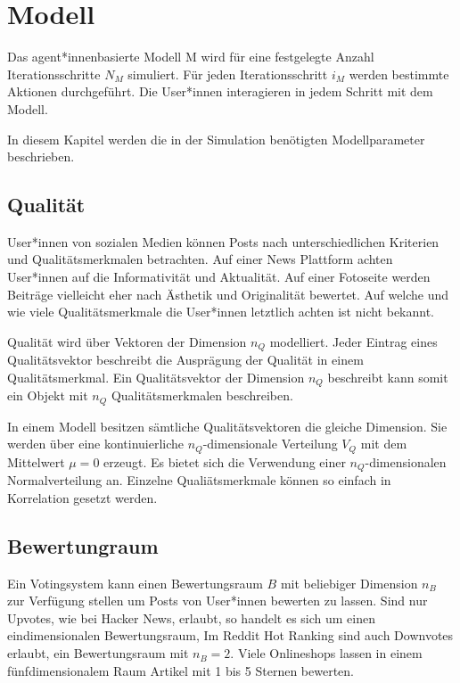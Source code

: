 \chapter{Modell}

Das agent*innenbasierte Modell \ac{M} wird für eine festgelegte Anzahl Iterationsschritte $N_M$ simuliert. Für jeden Iterationsschritt $i_M$ werden bestimmte Aktionen durchgeführt. Die User*innen interagieren in jedem Schritt mit dem Modell.

In diesem Kapitel werden die in der Simulation benötigten Modellparameter beschrieben.

\section{Qualität}
User*innen von sozialen Medien können Posts nach unterschiedlichen Kriterien und Qualitätsmerkmalen betrachten. Auf einer News Plattform achten User*innen auf die Informativität und Aktualität. Auf einer Fotoseite werden Beiträge vielleicht eher nach Ästhetik und Originalität bewertet. Auf welche und wie viele Qualitätsmerkmale die User*innen letztlich achten ist nicht bekannt.

Qualität wird über Vektoren der Dimension $n_Q$ modelliert. Jeder Eintrag eines Qualitätsvektor beschreibt die Ausprägung der Qualität in einem Qualitätsmerkmal. Ein Qualitätsvektor der Dimension $n_Q$ beschreibt kann somit ein Objekt mit $n_Q$ Qualitätsmerkmalen beschreiben. 

In einem Modell besitzen sämtliche Qualitätsvektoren die gleiche Dimension. Sie werden über eine kontinuierliche $n_Q$-dimensionale Verteilung $V_Q$ mit dem Mittelwert $\mu = 0$ erzeugt. Es bietet sich die Verwendung einer $n_Q$-dimensionalen Normalverteilung an. Einzelne Qualiätsmerkmale können so einfach in Korrelation gesetzt werden. 

\section{Bewertungraum}

Ein Votingsystem kann einen Bewertungsraum $B$ mit beliebiger Dimension $n_B$ zur Verfügung stellen um Posts von User*innen bewerten zu lassen. Sind nur Upvotes, wie bei Hacker News, erlaubt, so handelt es sich um einen eindimensionalen Bewertungsraum, Im Reddit Hot Ranking sind auch Downvotes erlaubt, ein Bewertungsraum mit $n_B = 2$. Viele Onlineshops lassen in einem fünfdimensionalem Raum Artikel mit 1 bis 5 Sternen bewerten.

